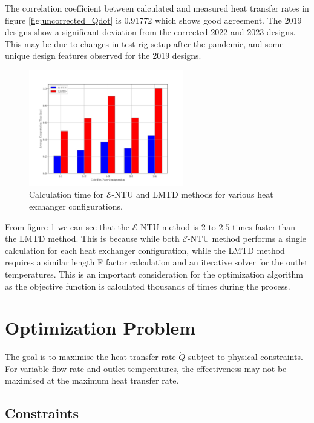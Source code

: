 \documentclass{article}
\begin{document}
The correlation coefficient between calculated and measured heat transfer rates in figure \ref{fig:uncorrected_Qdot} is $\mathbf{0.91772}$ which shows good agreement.
The 2019 designs show a significant deviation from the corrected 2022 and 2023 designs.
This may be due to changes in test rig setup after the pandemic, and some unique design features observed for the 2019 designs.

\begin{figure}[H]
  \centering
  \includegraphics[width=0.6\textwidth]{entu_lmtd_speed.png}
  \caption{Calculation time for $\mathcal{E}$-NTU and LMTD methods for various heat exchanger configurations.}
  \label{fig:entu_lmtd_speed}
\end{figure}

From figure \ref{fig:entu_lmtd_speed} we can see that the $\mathcal{E}$-NTU method is $2$ to $2.5$ times faster than the LMTD method.
This is because while both $\mathcal{E}$-NTU method performs a single calculation for each heat exchanger configuration, while the LMTD method requires a similar length F factor calculation and an iterative solver for the outlet temperatures.
This is an important consideration for the optimization algorithm as the objective function is calculated thousands of times during the process.



\section{Optimization Problem}

The goal is to maximise the heat transfer rate $\dot{Q}$ subject to physical constraints. For variable flow rate and outlet temperatures, the effectiveness may not be maximised at the maximum heat transfer rate.

\subsection{Constraints}
\end{document}
